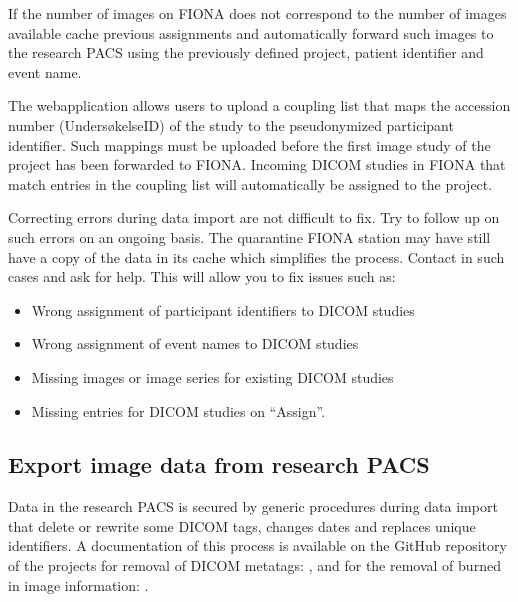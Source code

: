 \documentclass[letterpaper,10pt,english]{sphinxmanual}
\begin{document}
\sphinxAtStartPar
If the number of images on FIONA does not correspond to the number of images available cache previous assignments and automatically forward such images to the research PACS using the previously defined project, patient identifier and event name.

\sphinxAtStartPar
{}

\sphinxAtStartPar
The  web\sphinxhyphen{}application allows users to upload a coupling list that maps the accession
number (Undersøkelse\sphinxhyphen{}ID) of the study to the pseudonymized participant identifier. Such
mappings must be uploaded before the first image study of the project has been forwarded
to FIONA. Incoming DICOM studies in FIONA that match entries in the coupling list will
automatically be assigned to the project.

\sphinxAtStartPar
{}

\sphinxAtStartPar
Correcting errors during data import are not difficult to fix. Try to follow up on such errors
on an ongoing basis. The quarantine FIONA station may have still have a copy of the data in
its cache which simplifies the process. Contact  in such cases and ask for help. This will allow you to fix issues such as:
\begin{itemize}
\item {} 
\sphinxAtStartPar
Wrong assignment of participant identifiers to DICOM studies

\item {} 
\sphinxAtStartPar
Wrong assignment of event names to DICOM studies

\item {} 
\sphinxAtStartPar
Missing images or image series for existing DICOM studies

\item {} 
\sphinxAtStartPar
Missing entries for DICOM studies on “Assign”.

\end{itemize}


\subsection{Export image data from research PACS}
\label{\detokenize{EndUser/index:export-image-data-from-research-pacs}}
\sphinxAtStartPar
Data in the research PACS is secured by generic procedures during data import that delete or rewrite some DICOM tags, changes dates and replaces unique identifiers. A documentation of this process is available on the GitHub repository of the projects for removal of DICOM meta\sphinxhyphen{}tags: , and for the removal of burned in image information: .
\end{document}
